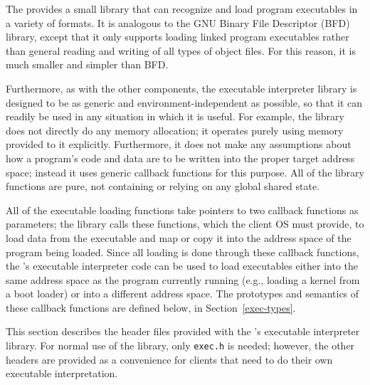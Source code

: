 %
% 
%
\label{exec}

The \oskit{} provides a small library
that can recognize and load program executables in a variety of formats.
It is analogous to the GNU Binary File Descriptor (BFD) library,
except that it only supports loading linked program executables
rather than general reading and writing of all types of object files.
For this reason, it is much smaller and simpler than BFD.

Furthermore, as with the other \oskit{} components,
the executable interpreter library is designed to be
as generic and environment-independent as possible,
so that it can readily be used in any situation in which it is useful.
For example, the library does not directly do any memory allocation;
it operates purely using memory provided to it explicitly.
Furthermore, it does not make any assumptions
about how a program's code and data are to be written
into the proper target address space;
instead it uses generic callback functions for this purpose.
All of the library functions are pure,
not containing or relying on any global shared state.

All of the executable loading functions
take pointers to two callback functions as parameters;
the library calls these functions,
which the client OS must provide,
to load data from the executable
and map or copy it into the address space of the program being loaded.
Since all loading is done through these callback functions,
the \oskit's executable interpreter code
can be used to load executables
either into the same address space as the program currently running
(e.g., loading a kernel from a boot loader)
or into a different address space.
The prototypes and semantics of these callback functions
are defined below, in Section~\ref{exec-types}.


This section describes the header files
provided with the \oskit's executable interpreter library.
For normal use of the library,
only \texttt{exec.h} is needed;
however, the other headers are provided
as a convenience for clients
that need to do their own executable interpretation.

